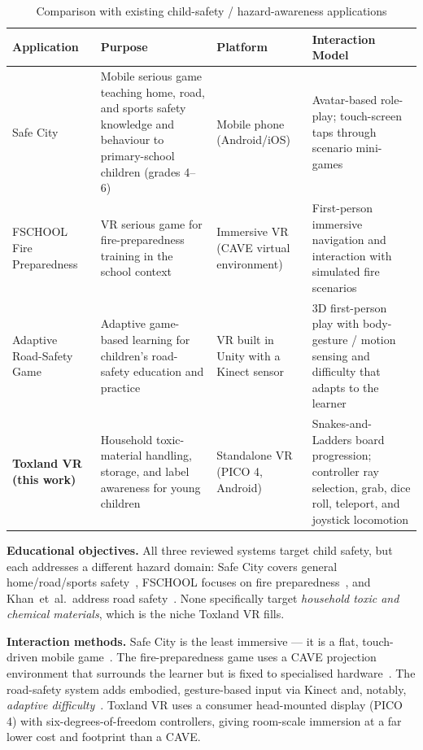 \documentclass[a4paper,12pt]{article}
\begin{document}
\begin{table}[H]
\centering
\caption{Comparison with existing child-safety / hazard-awareness applications}
\label{tab:background-study}
\renewcommand{\arraystretch}{1.35}
\begin{tabularx}{\textwidth}{|>{\raggedright\arraybackslash}p{3cm}|X|>{\raggedright\arraybackslash}p{3cm}|X|}
\hline
\textbf{Application} & \textbf{Purpose} & \textbf{Platform} & \textbf{Interaction Model} \\
\hline
Safe City~\cite{safecity2020} & Mobile serious game teaching home, road, and sports safety knowledge and behaviour to primary-school children (grades 4--6) & Mobile phone (Android/iOS) & Avatar-based role-play; touch-screen taps through scenario mini-games \\
\hline
FSCHOOL Fire Preparedness~\cite{fsfire2022} & VR serious game for fire-preparedness training in the school context & Immersive VR (CAVE virtual environment) & First-person immersive navigation and interaction with simulated fire scenarios \\
\hline
Adaptive Road-Safety Game~\cite{roadsafety2021} & Adaptive game-based learning for children's road-safety education and practice & VR built in Unity with a Kinect sensor & 3D first-person play with body-gesture / motion sensing and difficulty that adapts to the learner \\
\hline
\textbf{Toxland VR (this work)} & Household toxic-material handling, storage, and label awareness for young children & Standalone VR (PICO 4, Android) & Snakes-and-Ladders board progression; controller ray selection, grab, dice roll, teleport, and joystick locomotion \\
\hline
\end{tabularx}
\end{table}

\textbf{Educational objectives.} All three reviewed systems target child safety, but each addresses a different hazard domain: Safe City covers general home/road/sports safety~\cite{safecity2020}, FSCHOOL focuses on fire preparedness~\cite{fsfire2022}, and Khan~et~al.\ address road safety~\cite{roadsafety2021}. None specifically target \emph{household toxic and chemical materials}, which is the niche Toxland VR fills.

\textbf{Interaction methods.} Safe City is the least immersive --- it is a flat, touch-driven mobile game~\cite{safecity2020}. The fire-preparedness game uses a CAVE projection environment that surrounds the learner but is fixed to specialised hardware~\cite{fsfire2022}. The road-safety system adds embodied, gesture-based input via Kinect and, notably, \emph{adaptive difficulty}~\cite{roadsafety2021}. Toxland VR uses a consumer head-mounted display (PICO 4) with six-degrees-of-freedom controllers, giving room-scale immersion at a far lower cost and footprint than a CAVE.
\end{document}
